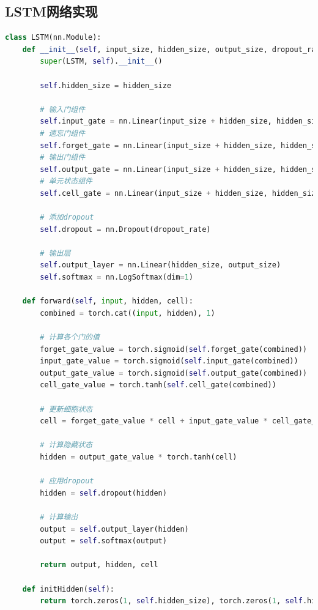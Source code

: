 \documentclass[a4paper]{article}
\begin{document}
\subsection{LSTM网络实现}
\begin{lstlisting}[language=Python, caption=LSTM网络完整实现]
class LSTM(nn.Module):
    def __init__(self, input_size, hidden_size, output_size, dropout_rate=0.2):
        super(LSTM, self).__init__()
        
        self.hidden_size = hidden_size
        
        # 输入门组件
        self.input_gate = nn.Linear(input_size + hidden_size, hidden_size)
        # 遗忘门组件
        self.forget_gate = nn.Linear(input_size + hidden_size, hidden_size)
        # 输出门组件
        self.output_gate = nn.Linear(input_size + hidden_size, hidden_size)
        # 单元状态组件
        self.cell_gate = nn.Linear(input_size + hidden_size, hidden_size)
        
        # 添加dropout
        self.dropout = nn.Dropout(dropout_rate)
        
        # 输出层
        self.output_layer = nn.Linear(hidden_size, output_size)
        self.softmax = nn.LogSoftmax(dim=1)
        
    def forward(self, input, hidden, cell):
        combined = torch.cat((input, hidden), 1)
        
        # 计算各个门的值
        forget_gate_value = torch.sigmoid(self.forget_gate(combined))
        input_gate_value = torch.sigmoid(self.input_gate(combined))
        output_gate_value = torch.sigmoid(self.output_gate(combined))
        cell_gate_value = torch.tanh(self.cell_gate(combined))
        
        # 更新细胞状态
        cell = forget_gate_value * cell + input_gate_value * cell_gate_value
        
        # 计算隐藏状态
        hidden = output_gate_value * torch.tanh(cell)
        
        # 应用dropout
        hidden = self.dropout(hidden)
        
        # 计算输出
        output = self.output_layer(hidden)
        output = self.softmax(output)
        
        return output, hidden, cell
        
    def initHidden(self):
        return torch.zeros(1, self.hidden_size), torch.zeros(1, self.hidden_size)
\end{lstlisting}
\end{document}
